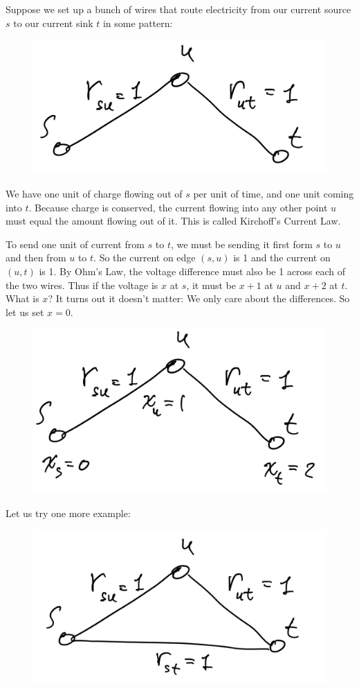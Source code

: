 Suppose we set up a bunch of wires that route electricity from our
current source $s$ to our current sink $t$ in some pattern:

\begin{figure}[H]
  \centering
  \includegraphics[width=0.5\linewidth]{fig/lecture1_graphpath.png}
  \label{fig:graphpath}
\end{figure}

We have one unit of charge flowing out of $s$ per unit of time, and
one unit coming into $t$.
Because charge is conserved, the current flowing into any other point
$u$ must equal the amount flowing out of it.
This is called Kirchoff's Current Law.

To send one unit of current from $s$ to $t$, we must be sending it
first form $s$ to $u$ and then from $u$ to $t$.
So the current on edge $(s,u)$ is 1 and the current on $(u,t)$ is 1.
By Ohm's Law, the voltage difference must also be 1 across each of the two
wires.
Thus if the voltage is $x$ at $s$, it must be $x+1$ at $u$ and $x+2$
at $t$. What is $x$? It turns out it doesn't matter: We only care
about the differences. So let us set $x = 0$.

\begin{figure}[H]
  \centering
  \includegraphics[width=0.5\linewidth]{fig/lecture1_graphpath-labelled.png}
  \label{fig:graphpathlabelled}
\end{figure}


Let us try one more example:

\begin{figure}[H]
  \centering
  \includegraphics[width=0.5\linewidth]{fig/lecture1_graphtriangle.png}
  \label{fig:graphtriangle}
\end{figure}

